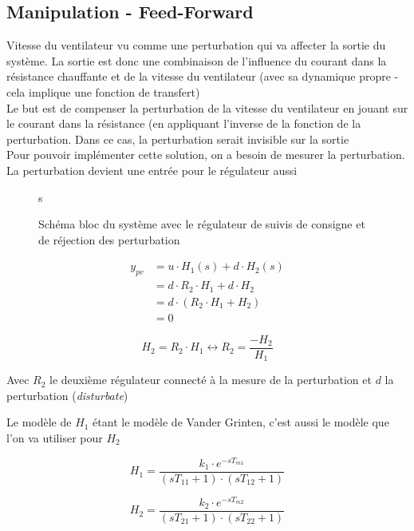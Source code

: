 \subsection{Manipulation - Feed-Forward}
\label{FW}
Vitesse du ventilateur vu comme une perturbation  qui va affecter la sortie du système. La sortie est donc une combinaison de l'influence du courant dans la résistance chauffante et de la vitesse du ventilateur (avec sa dynamique propre - cela implique une fonction de transfert)\\

Le but est de compenser la perturbation de la vitesse du ventilateur en jouant sur le courant dans la résistance (en appliquant l'inverse de la fonction de la perturbation. Dans ce cas, la perturbation serait invisible sur la sortie\\

Pour pouvoir implémenter cette solution, on a besoin de mesurer la perturbation. La perturbation devient une entrée pour le régulateur aussi\\

\begin{figure}

\caption{Schéma bloc du système avec le régulateur de suivis de consigne et de réjection des perturbation}s
\end{figure}


\begin{align}
y_{pv} &= u \cdot H_{1}(s) + d \cdot H_{2}(s)\\
	   &= d \cdot R_{2} \cdot H_{1} + d \cdot H_{2}\\
	   &= d \cdot (R_{2} \cdot H_{1} + H_{2})\\
	   &= 0
\end{align}

\begin{equation}
H_{2} = R_{2} \cdot H_{1} \leftrightarrow R_{2} = \frac{-H_{2}}{H_{1}}
\end{equation}

Avec $R_{2}$ le deuxième régulateur connecté à la mesure de la perturbation et $d$ la perturbation (\textit{disturbate})

Le modèle de $H_{1}$ étant le modèle de Vander Grinten, c'est aussi le modèle que l'on va utiliser pour $H_{2}$

\begin{equation}
H_{1} =  \frac{k_{1} \cdot e^{-sT_{m1}}}{(sT_{11} + 1) \cdot (sT_{12} + 1)}
\end{equation}

\begin{equation}
H_{2} =  \frac{k_{2} \cdot e^{-sT_{m2}}}{(sT_{21} + 1) \cdot (sT_{22} + 1)}
\end{equation}


